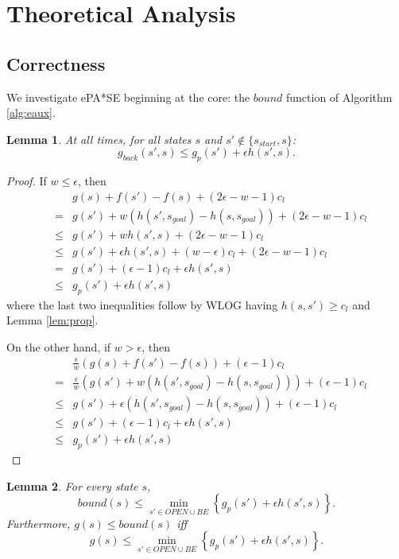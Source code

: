 \documentclass[letterpaper]{article}
\newtheorem{lemma}{Lemma}
\begin{document}
\section{Theoretical Analysis}

\subsection{Correctness}

We investigate ePA*SE beginning at the core: the $bound$ function of Algorithm \ref{alg:eaux}.

\begin{lemma}
\label{lem:indep}
At all times, for all states $s$ and $s'\notin \{s_{start},s\}$:
\[g_{back}(s',s) \le g_p(s') + \epsilon h(s',s).\]
\end{lemma}

\begin{proof}
If $w \le \epsilon$, then
\begin{eqnarray*}
&&g(s) + f(s') - f(s) + (2\epsilon-w-1)c_l
\\&=& g(s') + w(h(s',s_{goal}) - h(s,s_{goal})) + (2\epsilon-w-1)c_l
\\&\le& g(s') + wh(s',s) + (2\epsilon-w-1)c_l
\\&\le& g(s') + \epsilon h(s',s) + (w-\epsilon)c_l + (2\epsilon-w-1)c_l
\\&=& g(s') + (\epsilon-1)c_l + \epsilon h(s',s)
\\&\le& g_p(s') + \epsilon h(s',s)
\end{eqnarray*}
where the last two inequalities follow by WLOG having $h(s,s') \ge c_l$ and Lemma \ref{lem:prop}.

On the other hand, if $w > \epsilon$, then
\begin{eqnarray*}
&&\frac\epsilon w\left(g(s) + f(s') - f(s)\right) + (\epsilon-1)c_l
\\&=& \frac\epsilon w\left(g(s') + w(h(s',s_{goal}) - h(s,s_{goal})) \right) + (\epsilon-1)c_l
\\&\le& g(s') + \epsilon(h(s',s_{goal}) - h(s,s_{goal})) + (\epsilon-1)c_l
\\&\le& g(s') + (\epsilon-1)c_l + \epsilon h(s',s)
\\&\le& g_p(s') + \epsilon h(s',s)
\end{eqnarray*}
\end{proof}

\begin{lemma}
\label{lem:bound}
For every state $s$,
\[bound(s) \le \min_{s'\in OPEN \cup BE} \left\{ g_p(s') + \epsilon h(s',s) \right\}.\]
Furthermore, $g(s) \le bound(s)$ iff
\[g(s) \le \min_{s'\in OPEN \cup BE} \left\{ g_p(s') + \epsilon h(s',s) \right\}.\]
\end{lemma}
\end{document}
